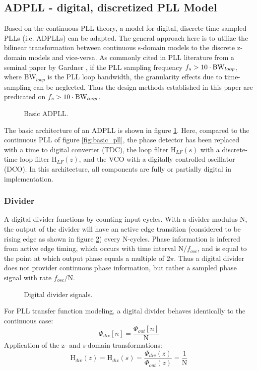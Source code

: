 \subsection{ADPLL - digital, discretized PLL Model}\label{adpll_model}
Based on the continuous PLL theory, a model for digital, discrete time sampled PLLs (i.e. ADPLLs) can be adapted. The general approach here is to utilize the bilinear transformation between continuous s-domain models to the discrete z-domain models and vice-versa. As commonly cited in PLL literature from a seminal paper by Gardner \cite{gardner_1980}, if the PLL sampling frequency $f_s > 10\cdot\textnormal{BW}_{loop}$, where BW$_{loop}$ is the PLL loop bandwidth, the granularity effects due to time-sampling can be neglected. Thus the design methods established in this paper are predicated on $f_s > 10\cdot\textnormal{BW}_{loop}$.
\begin{figure}[htb!]
	\center
	\caption{Basic ADPLL.}
	\label{fig:basic_adpll}
\end{figure}
\FloatBarrier
The basic architecture of an ADPLL is shown in figure \ref{fig:basic_adpll}. Here, compared to the continuous PLL of figure \ref{fig:basic_pll}, the phase detector has been replaced with a time to digital converter (TDC), the loop filter $\mathrm{H}_{LF}(s)$ with a discrete-time loop filter $\mathrm{H}_{LF}(z)$, and the VCO with a digitally controlled oscillator (DCO). In this architecture, all components are fully or partially digital in implementation. 

\subsubsection{Divider}
	A digital divider functions by counting input cycles. With a divider modulus N, the output of the divider will have an active edge transition (considered to be rising edge as shown in figure \ref{fig:digital_div}) every N-cycles. Phase information is inferred from active edge timing, which occurs with time interval N$/f_{osc}$, and is equal to the point at which output phase equals a multiple of $2\pi$. Thus a digital divider does not provider continuous phase information, but rather a sampled phase signal with rate $f_{osc}/$N. 
	\begin{figure}[htb!]
		\center
		\caption{Digital divider signals.}
		\label{fig:digital_div}
	\end{figure}

	For PLL transfer function modeling, a digital divider behaves identically to the continuous case:
	\begin{equation}
		\Phi_{div}[n] = \frac{\Phi_{out}[n]}{\mathrm{N}}
	\end{equation}
	Application of the z- and s-domain transformations:
	\begin{equation}
		\mathrm{H}_{div}(z) = \mathrm{H}_{div}(s) = \frac{\Phi_{div}(z)}{\Phi_{out}(z)} = \frac{1}{\mathrm{N}}
	\end{equation}

